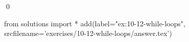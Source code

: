 
\begin{ex}
  \label{ex:10-12-while-loops}
  
  \qed
\end{ex}
\begin{python0}
from solutions import *
add(label="ex:10-12-while-loops",
    srcfilename='exercises/10-12-while-loops/answer.tex')
\end{python0}
